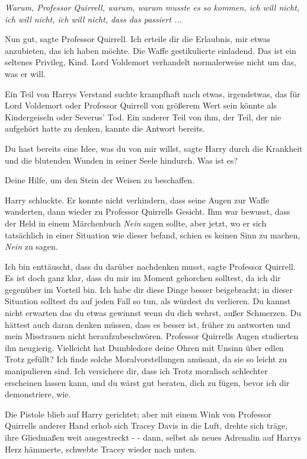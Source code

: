 \emph{Warum, Professor Quirrell, warum, warum musste es so kommen, ich will
nicht, ich will nicht, ich will nicht, dass das passiert ...}

\glqq{}Nun gut\grqq{}, sagte Professor Quirrell. \glqq{}Ich erteile dir die
Erlaubnis, mir etwas anzubieten, das ich haben möchte.\grqq{} Die Waffe gestikulierte
einladend. \glqq{}Das ist ein seltenes Privileg, Kind. Lord Voldemort verhandelt
normalerweise nicht um das, was er will.\grqq{}

Ein Teil von Harrys Verstand suchte krampfhaft nach etwas, irgendetwas, das für
Lord Voldemort oder Professor Quirrell von größerem Wert sein könnte als
Kindergeiseln oder Severus' Tod. Ein anderer Teil von ihm, der Teil, der nie
aufgehört hatte zu denken, kannte die Antwort bereits.

\glqq{}Du hast bereits eine Idee, was du von mir willst\grqq{}, sagte Harry durch
die Krankheit und die blutenden Wunden in seiner Seele hindurch. \glqq{}Was ist
es?\grqq{}

\glqq{}Deine Hilfe, um den Stein der Weisen zu beschaffen.\grqq{}

Harry schluckte. Er konnte nicht verhindern, dass seine Augen zur Waffe
wanderten, dann wieder zu Professor Quirrells Gesicht. Ihm war bewusst, dass der
Held in einem Märchenbuch \emph{\glqq{}Nein\grqq{}} sagen sollte, aber jetzt, wo
er sich tatsächlich in einer Situation wie dieser befand, schien es keinen Sinn
zu machen,\emph{ \glqq{}Nein\grqq{}} zu sagen.

\glqq{}Ich bin enttäuscht, dass du darüber nachdenken musst\grqq{}, sagte
Professor Quirrell. \glqq{}Es ist doch ganz klar, dass du mir im Moment gehorchen
solltest, da ich dir gegenüber im Vorteil bin. Ich habe dir diese Dinge besser
beigebracht; in dieser Situation solltest du auf jeden Fall so tun, als würdest
du verlieren. Du kannst nicht erwarten das du etwas gewinnst wenn du dich
wehrst, außer Schmerzen. Du hättest auch daran denken müssen, dass es besser
ist, früher zu antworten und mein Misstrauen nicht heraufzubeschwören.\grqq{}
Professor Quirrells Augen studierten ihn neugierig. \glqq{}Vielleicht hat
Dumbledore deine Ohren mit Unsinn über edlen Trotz gefüllt? Ich finde solche
Moralvorstellungen amüsant, da sie so leicht zu manipulieren sind. Ich
versichere dir, dass ich Trotz moralisch schlechter erscheinen lassen kann, und
du wärst gut beraten, dich zu fügen, bevor ich dir demonstriere, wie.\grqq{}

Die Pistole blieb auf Harry gerichtet; aber mit einem Wink von Professor
Quirrells anderer Hand erhob sich Tracey Davis in die Luft, drehte sich träge,
ihre Gliedmaßen weit ausgestreckt - - dann, selbst als neues Adrenalin auf
Harrys Herz hämmerte, schwebte Tracey wieder nach unten.

